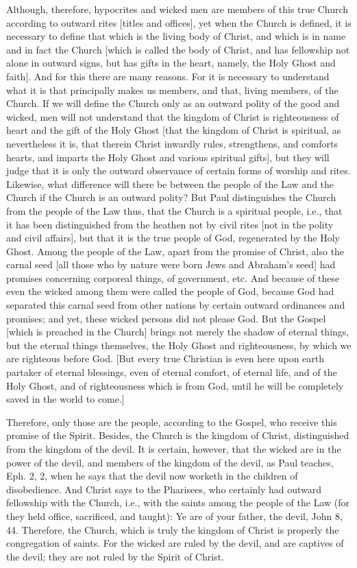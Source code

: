 Although, therefore, hypocrites and wicked men are members of this
true Church according to outward rites [titles and offices], yet when
the Church is defined, it is necessary to define that which is the
living body of Christ, and which is in name and in fact the Church
[which is called the body of Christ, and has fellowship not alone in
outward signs, but has gifts in the heart, namely, the Holy Ghost and
faith].  And for this there are many reasons.  For it is necessary to
understand what it is that principally makes us members, and that,
living members, of the Church.  If we will define the Church only as
an outward polity of the good and wicked, men will not understand
that the kingdom of Christ is righteousness of heart and the gift of
the Holy Ghost [that the kingdom of Christ is spiritual, as
nevertheless it is, that therein Christ inwardly rules, strengthens,
and comforts hearts, and imparts the Holy Ghost and various spiritual
gifts], but they will judge that it is only the outward observance of
certain forms of worship and rites.  Likewise, what difference will
there be between the people of the Law and the Church if the Church
is an outward polity?  But Paul distinguishes the Church from the
people of the Law thus, that the Church is a spiritual people, i.e.,
that it has been distinguished from the heathen not by civil rites
[not in the polity and civil affairs], but that it is the true people
of God, regenerated by the Holy Ghost.  Among the people of the Law,
apart from the promise of Christ, also the carnal seed [all those who
by nature were born Jews and Abraham's seed] had promises concerning
corporeal things, of government, etc. And because of these even the
wicked among them were called the people of God, because God had
separated this carnal seed from other nations by certain outward
ordinances and promises; and yet, these wicked persons did not please
God.  But the Gospel [which is preached in the Church] brings not
merely the shadow of eternal things, but the eternal things
themselves, the Holy Ghost and righteousness, by which we are
righteous before God.  [But every true Christian is even here upon
earth partaker of eternal blessings, even of eternal comfort, of
eternal life, and of the Holy Ghost, and of righteousness which is
from God, until he will be completely saved in the world to come.]

Therefore, only those are the people, according to the Gospel, who
receive this promise of the Spirit.  Besides, the Church is the
kingdom of Christ, distinguished from the kingdom of the devil.  It
is certain, however, that the wicked are in the power of the devil,
and members of the kingdom of the devil, as Paul teaches, Eph. 2, 2,
when he says that the devil now worketh in the children of
disobedience.  And Christ says to the Pharisees, who certainly had
outward fellowship with the Church, i.e., with the saints among the
people of the Law (for they held office, sacrificed, and taught): Ye
are of your father, the devil, John 8, 44. Therefore, the Church,
which is truly the kingdom of Christ is properly the congregation of
saints.  For the wicked are ruled by the devil, and are captives of
the devil; they are not ruled by the Spirit of Christ.

